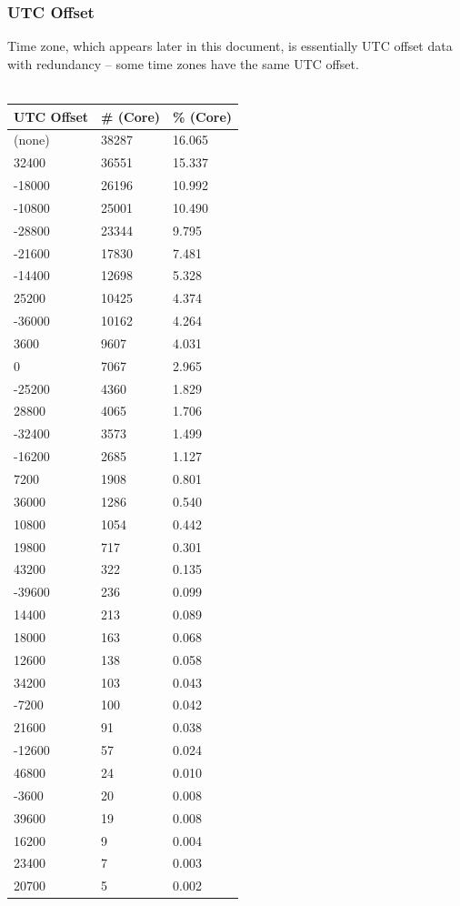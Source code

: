 \subsubsection{UTC Offset}
Time zone, which appears later in this document, is essentially UTC offset data with redundancy -- some time zones have the same UTC offset.\\\\
\begin{tabular}{| l | l | l |}
\hline
\textbf{UTC Offset} & \textbf{\# (Core)} & \textbf{\% (Core)} \\ \hline
(none)	&	38287	&	16.065	\\ \hline
32400	&	36551	&	15.337	\\ \hline
-18000	&	26196	&	10.992	\\ \hline
-10800	&	25001	&	10.490	\\ \hline
-28800	&	23344	&	9.795	\\ \hline
-21600	&	17830	&	7.481	\\ \hline
-14400	&	12698	&	5.328	\\ \hline
25200	&	10425	&	4.374	\\ \hline
-36000	&	10162	&	4.264	\\ \hline
3600	&	9607	&	4.031	\\ \hline
0	&	7067	&	2.965	\\ \hline
-25200	&	4360	&	1.829	\\ \hline
28800	&	4065	&	1.706	\\ \hline
-32400	&	3573	&	1.499	\\ \hline
-16200	&	2685	&	1.127	\\ \hline
7200	&	1908	&	0.801	\\ \hline
36000	&	1286	&	0.540	\\ \hline
10800	&	1054	&	0.442	\\ \hline
19800	&	717	&	0.301	\\ \hline
43200	&	322	&	0.135	\\ \hline
-39600	&	236	&	0.099	\\ \hline
14400	&	213	&	0.089	\\ \hline
18000	&	163	&	0.068	\\ \hline
12600	&	138	&	0.058	\\ \hline
34200	&	103	&	0.043	\\ \hline
-7200	&	100	&	0.042	\\ \hline
21600	&	91	&	0.038	\\ \hline
-12600	&	57	&	0.024	\\ \hline
46800	&	24	&	0.010	\\ \hline
-3600	&	20	&	0.008	\\ \hline
39600	&	19	&	0.008	\\ \hline
16200	&	9	&	0.004	\\ \hline
23400	&	7	&	0.003	\\ \hline
20700	&	5	&	0.002	\\ \hline
\end{tabular}
\vspace{2.5in}

